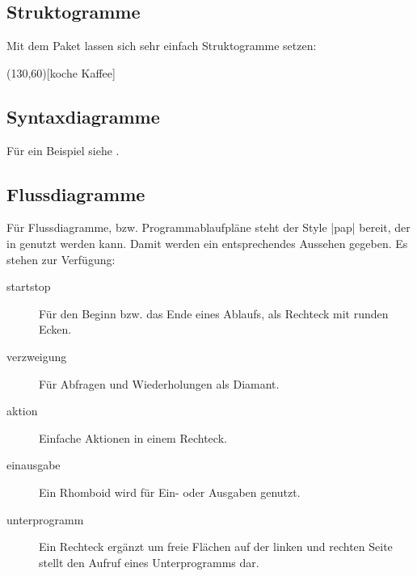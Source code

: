 \subsection{Struktogramme}
Mit dem Paket  lassen sich sehr einfach Struktogramme setzen:

\begin{example}[gobble=4]
    \begin{struktogramm}(130,60)[koche Kaffee]
    \change
    \ifend
    \whileend
    \end{struktogramm}
\end{example}

\subsection{Syntaxdiagramme}
Für ein Beispiel siehe .

\subsection{Flussdiagramme}
Für Flussdiagramme, bzw. Programmablaufpläne steht der Style \verbcode|pap| bereit, der in  genutzt werden kann. Damit werden  ein entsprechendes Aussehen gegeben. Es stehen zur Verfügung:
\begin{description}
    \item[startstop] Für den Beginn bzw. das Ende eines Ablaufs, als Rechteck mit runden Ecken.
    \item[verzweigung] Für Abfragen und Wiederholungen als Diamant.
    \item[aktion] Einfache Aktionen in einem Rechteck.
    \item[einausgabe] Ein Rhomboid wird für Ein- oder Ausgaben genutzt.
    \item[unterprogramm] Ein Rechteck ergänzt um freie Flächen auf der linken und rechten Seite stellt den Aufruf eines Unterprogramms dar.
\end{description}

